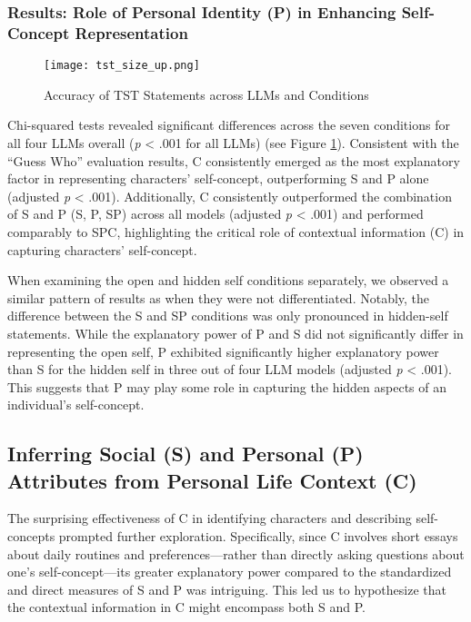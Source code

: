 \subsubsection{Results: Role of Personal Identity (P) in Enhancing Self-Concept Representation}

\begin{figure}
    \centering
    \texttt{[image: tst\_size\_up.png]}
    \caption{Accuracy of TST Statements across LLMs and Conditions}
    \label{fig:4}
\end{figure}


Chi-squared tests revealed significant differences across the seven conditions for all four LLMs overall (\textit{p} < .001 for all LLMs) (see Figure \ref{fig:4}). Consistent with the ``Guess Who'' evaluation results, C consistently emerged as the most explanatory factor in representing characters' self-concept, outperforming S and P alone (adjusted \textit{p} < .001). Additionally, C consistently outperformed the combination of S and P (S, P, SP) across all models (adjusted \textit{p} < .001) and performed comparably to SPC, highlighting the critical role of contextual information (C) in capturing characters' self-concept.

When examining the open and hidden self conditions separately, we observed a similar pattern of results as when they were not differentiated. Notably, the difference between the S and SP conditions was only pronounced in hidden-self statements. While the explanatory power of P and S did not significantly differ in representing the open self, P exhibited significantly higher explanatory power than S for the hidden self in three out of four LLM models (adjusted \textit{p} < .001). This suggests that P may play some role in capturing the hidden aspects of an individual's self-concept.


\subsection{Inferring Social (S) and Personal (P) Attributes from Personal Life Context (C)}
\label{sec:inference_test}
The surprising effectiveness of C in identifying characters and describing self-concepts prompted further exploration. Specifically, since C involves short essays about daily routines and preferences—rather than directly asking questions about one's self-concept—its greater explanatory power compared to the standardized and direct measures of S and P was intriguing. This led us to hypothesize that the contextual information in C might encompass both S and P.

